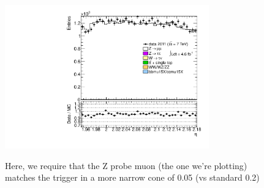 {\includegraphics[width=0.66\textwidth]{dates/20130306/figures/etaphi/Ztprobe_10_A_stack_lN_eta_ALL.pdf} 
\cole
}

 {
Here, we require that the Z probe muon (the one we're plotting) \\
matches the trigger in a more narrow cone of 0.05 (vs standard 0.2)
}
